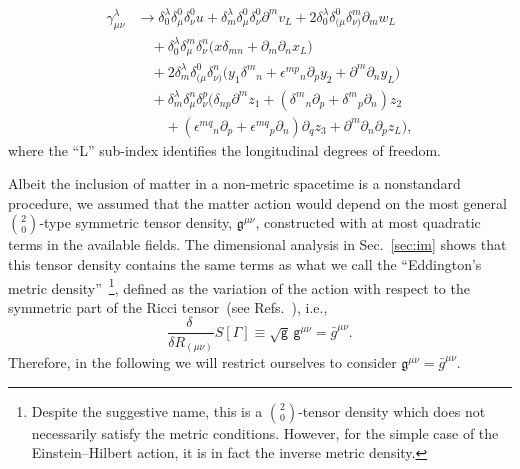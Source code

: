 \documentclass[aps,prd,12pt,twocolumn,superscriptaddress,showpacs,showkeys,reprint%
]{revtex4-1}
\renewcommand{\(}{\left(}
\renewcommand{\)}{\right)}
\renewcommand{\[}{\left[}
\renewcommand{\]}{\right]}
\newcommand{\hl}[1]{{\color{red} \bfseries{#1}}}
\begin{document}
\begin{equation}
  \begin{split}
    \gamma^\lambda_{\mu\nu}
    &\to
    \delta^\lambda_0\delta^0_\mu\delta^0_\nu u 
    + \delta^\lambda_m \delta^0_\mu\delta^0_\nu \partial^m v_L
    + 2\delta^\lambda_0 \delta^0_{(\mu}\delta^m_{\nu)} \partial_m w_L
    \\
    & \quad + \delta^\lambda_0 \delta^m_\mu\delta^n_\nu \Big(x \delta_{mn} + \partial_m \partial_n x_L\Big)
    \\
    & \quad + 2\delta^\lambda_m \delta^0_{(\mu}\delta^n_{\nu)} \Big(y_1 \delta^m{}_n + \epsilon^{m p}{}_{n} \partial_p y_2 + \partial^m \partial_n y_L\Big)
    \\
    & \quad + \delta^\lambda_m \delta^n_{\mu}\delta^p_{\nu} \Big(\delta_{n p} \partial^m z_1 + (\delta^m{}_n \partial_p+\delta^m{}_p \partial_n) z_2
    \\
    & \qquad +  (\epsilon^{m q}{}_n \partial_p+\epsilon^{m q}{}_p \partial_n) \partial_q z_3 + \partial^m \partial_n \partial_p z_L\Big),
  \end{split}
\end{equation}
where the ``L'' sub-index identifies the longitudinal degrees of freedom.


Albeit the inclusion of matter in a non-metric spacetime is a nonstandard procedure, we assumed that the matter action would depend on the most general $\binom{2}{0}$-type symmetric tensor density, $\mathfrak{g}^{\mu \nu}$, constructed with at most quadratic terms in the available fields. The dimensional analysis in Sec.~\ref{sec:im} shows that this tensor density contains the same terms as what we call the ``Eddington's metric density''~\footnote{Despite the suggestive name, this is a $\binom{2}{0}$-tensor density which does not necessarily satisfy the metric conditions. However, for the simple case of the Einstein--Hilbert action, it is in fact the inverse metric density.}, defined as the variation of the action with respect to the symmetric part of the Ricci tensor~(see Refs.~\cite{Eddington1923math,schrodinger1950space,Poplawski:2012bw}), i.e.,%
\begin{equation}
  \label{metric}
  \frac{\delta\ }{\delta R_{(\mu\nu)}} S[\Gamma] \equiv \sqrt{\mathsf{g}} \, \mathsf{g}^{\mu\nu} = \bar{g}^{\mu\nu}.
\end{equation}
Therefore, in the following we will restrict ourselves to consider $\mathfrak{g}^{\mu \nu} = \bar{g}^{\mu\nu}$.
\end{document}

